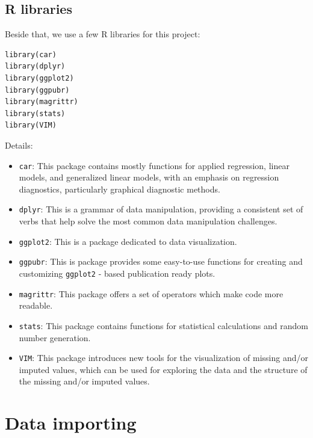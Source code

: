 \documentclass[a4paper]{article}
\begin{document}
\subsection{R libraries}
Beside that, we use a few R libraries for this project:
\begin{mdframed}[leftline=false,rightline=false,backgroundcolor=lightblue!10,nobreak=false]
    \begin{verbatim}
library(car)
library(dplyr)
library(ggplot2)
library(ggpubr)
library(magrittr)
library(stats)
library(VIM)
    \end{verbatim}
\end{mdframed}
Details:
\begin{itemize}
    \item \verb|car|: This package contains mostly functions for applied regression, linear models, and generalized linear models, with an emphasis on regression diagnostics, particularly graphical diagnostic methods.
    \item \verb|dplyr|:  This is a grammar of data manipulation, providing a consistent set of verbs that help solve the most common data manipulation challenges.
    \item \verb|ggplot2|: This is a package dedicated to data visualization.
    \item \verb|ggpubr|: This is package provides some easy-to-use functions for creating and customizing \verb|ggplot2| - based publication ready plots.
    \item \verb|magrittr|: This package offers a set of operators which make code more readable.
    \item \verb|stats|: This package contains functions for statistical calculations and random number generation.
    \item \verb|VIM|: This package introduces new tools for the visualization of missing and/or imputed values, which can be used for exploring the data and the structure of the missing and/or imputed values.
\end{itemize}


\section{Data importing}
\end{document}
